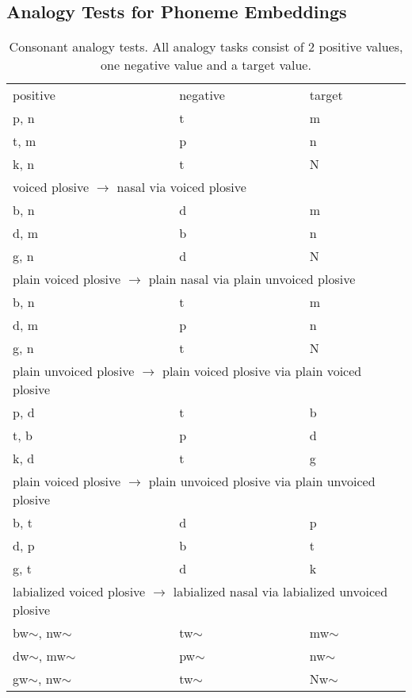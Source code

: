 \documentclass[6pt]{article}
\begin{document}
\subsection{Analogy Tests for Phoneme Embeddings} \label{App:analogy_tests}


\begin{longtable}{ l | l | l }

\caption{Consonant analogy tests. All analogy tasks consist of 2 positive values, one negative value and a target value.}
\centering
\tiny
\hline \multicolumn{3}{l}{voiceless plosive $\rightarrow$ nasal via unvoiced plosive}\\  \hline
positive & negative & target \\ \hline
p, n & t & m \\
t, m & p & n \\
k, n & t & N \\ 
 \hline \multicolumn{3}{l}{voiced plosive $\rightarrow$ nasal via voiced plosive}\\  \hline
b, n & d & m \\
d, m & b & n \\
g, n & d & N \\
 \hline \multicolumn{3}{l}{plain voiced plosive $\rightarrow$ plain nasal via plain unvoiced plosive}\\  \hline
b, n & t & m \\
d, m & p & n \\
g, n & t & N \\
 \hline \multicolumn{3}{l}{plain unvoiced plosive $\rightarrow$ plain voiced plosive via plain voiced plosive}\\  \hline
p, d & t & b \\
t, b & p & d \\
k, d & t & g \\
 \hline \multicolumn{3}{l}{plain voiced plosive $\rightarrow$ plain unvoiced plosive via plain unvoiced plosive}\\  \hline
b, t & d & p \\
d, p & b & t \\
g, t & d & k \\
 \hline \multicolumn{3}{l}{labialized voiced plosive $\rightarrow$  labialized nasal via labialized unvoiced plosive}\\  \hline
bw$\sim$, nw$\sim$ & tw$\sim$ & mw$\sim$ \\
dw$\sim$, mw$\sim$ & pw$\sim$ & nw$\sim$ \\
gw$\sim$, nw$\sim$ & tw$\sim$ & Nw$\sim$ \\

\end{longtable}
\end{document}
